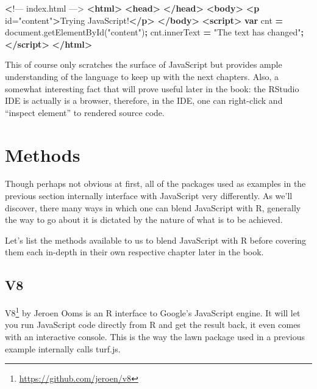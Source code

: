 \documentclass[
]{krantz}
\makeatletter
\newenvironment{Shaded}{\begin{snugshade}}{\end{snugshade}}
\newcommand{\AttributeTok}[1]{\textcolor[rgb]{0.61,0.61,0.61}{#1}}
\newcommand{\ErrorTok}[1]{\textcolor[rgb]{0.14,0.14,0.14}{\textbf{#1}}}
\newcommand{\KeywordTok}[1]{\textcolor[rgb]{0.27,0.27,0.27}{\textbf{#1}}}
\newcommand{\NormalTok}[1]{#1}
\newcommand{\OperatorTok}[1]{\textcolor[rgb]{0.43,0.43,0.43}{\textbf{#1}}}
\newcommand{\OtherTok}[1]{\textcolor[rgb]{0.37,0.37,0.37}{#1}}
\newcommand{\StringTok}[1]{\textcolor[rgb]{0.5,0.5,0.5}{#1}}
\newcommand{\VariableTok}[1]{\textcolor[rgb]{0,0,0}{#1}}
\renewcommand{\href}[2]{#2\footnote{\url{#1}}}
\newenvironment{kframe}{%
\medskip{}
\setlength{\fboxsep}{.8em}
 \def\at@end@of@kframe{}%
 \ifinner\ifhmode%
  \def\at@end@of@kframe{\end{minipage}}%
  \begin{minipage}{\columnwidth}%
 \fi\fi%
 \def\FrameCommand##1{\hskip\@totalleftmargin \hskip-\fboxsep
 \colorbox{shadecolor}{##1}\hskip-\fboxsep
     \hskip-\linewidth \hskip-\@totalleftmargin \hskip\columnwidth}%
 \MakeFramed {\advance\hsize-\width
   \@totalleftmargin\z@ \linewidth\hsize
   \@setminipage}}%
 {\par\unskip\endMakeFramed%
 \at@end@of@kframe}
\renewenvironment{Shaded}{\begin{kframe}}{\end{kframe}}
\makeatother
\begin{document}
\begin{Shaded}
\begin{Highlighting}[]
 \ErrorTok{<}\NormalTok{!–– index.html ––>}
\KeywordTok{<html>}
  \KeywordTok{<head>}
  \KeywordTok{</head>}
  \KeywordTok{<body>}
    \KeywordTok{<p}\OtherTok{ id=}\StringTok{"content"}\KeywordTok{>}\NormalTok{Trying JavaScript!}\KeywordTok{</p>}
  \KeywordTok{</body>}
  \KeywordTok{<script>}
    \KeywordTok{var}\NormalTok{ cnt }\OperatorTok{=} \VariableTok{document}\NormalTok{.}\AttributeTok{getElementById}\NormalTok{(}\StringTok{"content"}\NormalTok{)}\OperatorTok{;}
    \VariableTok{cnt}\NormalTok{.}\AttributeTok{innerText} \OperatorTok{=} \StringTok{"The text has changed"}\OperatorTok{;}
  \KeywordTok{</script>}
\KeywordTok{</html>}
\end{Highlighting}
\end{Shaded}

This of course only scratches the surface of JavaScript but provides ample understanding of the language to keep up with the next chapters. Also, a somewhat interesting fact that will prove useful later in the book: the RStudio IDE is actually is a browser, therefore, in the IDE, one can right-click and ``inspect element'' to rendered source code.

\hypertarget{methods}{%
\section*{Methods}\label{methods}}


Though perhaps not obvious at first, all of the packages used as examples in the previous section internally interface with JavaScript very differently. As we'll discover, there many ways in which one can blend JavaScript with R, generally the way to go about it is dictated by the nature of what is to be achieved.

Let's list the methods available to us to blend JavaScript with R before covering them each in-depth in their own respective chapter later in the book.

\hypertarget{v8}{%
\subsection*{V8}\label{v8}}


\href{https://github.com/jeroen/v8}{V8} by Jeroen Ooms is an R interface to Google's JavaScript engine. It will let you run JavaScript code directly from R and get the result back, it even comes with an interactive console. This is the way the lawn package used in a previous example internally calls turf.js.
\end{document}
